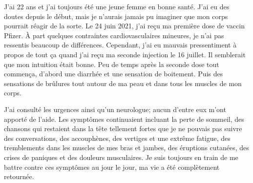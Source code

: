 J'ai 22 ans et j'ai toujours été une jeune femme en bonne santé. J'ai eu des
doutes depuis le début, mais je n'aurais jamais pu imaginer que mon corps
pourrait réagir de la sorte. Le 24 juin 2021, j'ai reçu ma première dose de
vaccin Pfizer. À part quelques contraintes cardiovasculaires mineures, je n'ai
pas ressentis beaucoup de différences. Cependant, j'ai eu mauvais pressentiment
à propos de tout ça quand j'ai reçu ma seconde injection le 16 juillet. Il
semblerait que mon intuition était bonne. Peu de temps après la seconde dose
tout commença, d'abord une diarrhée et une sensation de boitement. Puis des
sensations de brûlures tout autour de ma peau et dans tous les muscles de mon
corps.

J'ai consulté les urgences ainsi qu'un neurologue; aucun d'entre eux m'ont
apporté de l'aide. Les symptômes continuaient incluant la perte de sommeil, des
chansons qui restaient dans la tête tellement fortes que je ne pouvais pas
suivre des conversations, des accouphènes, des vertiges et une extrême fatigue,
des tremblements dans les muscles de mes bras et jambes, des éruptions cutanées,
des crises de paniques et des douleurs musculaires. Je suis toujours en train de
me battre contre ces symptômes au jour le jour, ma vie a été complètement
retournée.


